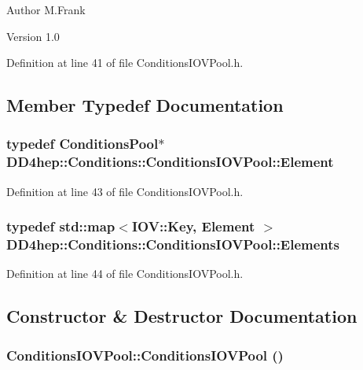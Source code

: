 \begin{DoxyAuthor}{Author}
M.Frank 
\end{DoxyAuthor}
\begin{DoxyVersion}{Version}
1.0 
\end{DoxyVersion}


Definition at line 41 of file ConditionsIOVPool.h.

\subsection{Member Typedef Documentation}
\hypertarget{class_d_d4hep_1_1_conditions_1_1_conditions_i_o_v_pool_a41146867e220b8f23ef69afe5f724914}{
\subsubsection[{Element}]{\setlength{\rightskip}{0pt plus 5cm}typedef {\bf ConditionsPool}$\ast$ {\bf DD4hep::Conditions::ConditionsIOVPool::Element}}}
\label{class_d_d4hep_1_1_conditions_1_1_conditions_i_o_v_pool_a41146867e220b8f23ef69afe5f724914}


Definition at line 43 of file ConditionsIOVPool.h.\hypertarget{class_d_d4hep_1_1_conditions_1_1_conditions_i_o_v_pool_aa011c5cc19bfb761be62adf9a88b5ee9}{
\subsubsection[{Elements}]{\setlength{\rightskip}{0pt plus 5cm}typedef std::map$<${\bf IOV::Key}, {\bf Element} $>$ {\bf DD4hep::Conditions::ConditionsIOVPool::Elements}}}
\label{class_d_d4hep_1_1_conditions_1_1_conditions_i_o_v_pool_aa011c5cc19bfb761be62adf9a88b5ee9}


Definition at line 44 of file ConditionsIOVPool.h.

\subsection{Constructor \& Destructor Documentation}
\hypertarget{class_d_d4hep_1_1_conditions_1_1_conditions_i_o_v_pool_a8ccf22020bacb07028aea997d172c7d0}{
\subsubsection[{ConditionsIOVPool}]{\setlength{\rightskip}{0pt plus 5cm}ConditionsIOVPool::ConditionsIOVPool ()}}
\label{class_d_d4hep_1_1_conditions_1_1_conditions_i_o_v_pool_a8ccf22020bacb07028aea997d172c7d0}


